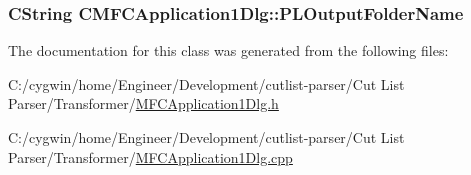 \subsubsection[{P\+L\+Output\+Folder\+Name}]{\setlength{\rightskip}{0pt plus 5cm}C\+String C\+M\+F\+C\+Application1\+Dlg\+::\+P\+L\+Output\+Folder\+Name}\label{class_c_m_f_c_application1_dlg_a423f6a89b2e29996bade428103d298b0}


The documentation for this class was generated from the following files\+:\begin{DoxyCompactItemize}
\item 
C\+:/cygwin/home/\+Engineer/\+Development/cutlist-\/parser/\+Cut List Parser/\+Transformer/\hyperlink{_m_f_c_application1_dlg_8h}{M\+F\+C\+Application1\+Dlg.\+h}\item 
C\+:/cygwin/home/\+Engineer/\+Development/cutlist-\/parser/\+Cut List Parser/\+Transformer/\hyperlink{_m_f_c_application1_dlg_8cpp}{M\+F\+C\+Application1\+Dlg.\+cpp}\end{DoxyCompactItemize}
